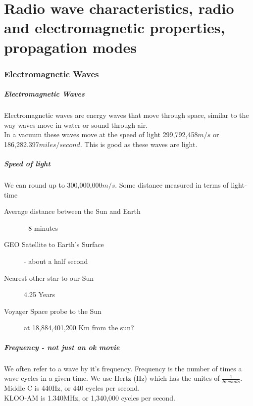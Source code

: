 \documentclass[10pt]{beamer}
\begin{document}
\part{Radio wave characteristics, radio and electromagnetic properties, propagation modes}
\section{Electromagnetic Waves}
\begin{frame}
\frametitle{Electromagnetic Waves}
Electromagnetic waves are energy waves that move through space, similar to the way waves move in water or sound through air.\\
In a vacuum these waves move at the speed of light 299,792,458$m/s$ or 186,282.397$miles/second$. This is good as these waves are light.
\end{frame}

\begin{frame}
\frametitle{Speed of light}
We can round up to 300,000,000$m/s$. Some distance measured in terms of light-time
\begin{description}
\item[Average distance between the Sun and Earth] - 8 minutes
\item[GEO Satellite to Earth's Surface] - about a half second
\item[Nearest other star to our Sun] 4.25 Years
\item[Voyager Space probe to the Sun] at 18,884,401,200 Km from the sun?  
\end{description}
\end{frame}

\begin{frame}
\frametitle{Frequency - not just an ok movie}
We often refer to a wave by it's frequency. Frequency is the number of times a wave cycles in a given time. We use Hertz (Hz) which has the unites of $\frac{1}{Seconds}$.\\
Middle C is 440Hz, or 440 cycles per second.\\
KLOO-AM is 1.340MHz, or 1,340,000 cycles per second.
\end{frame}
\end{document}

